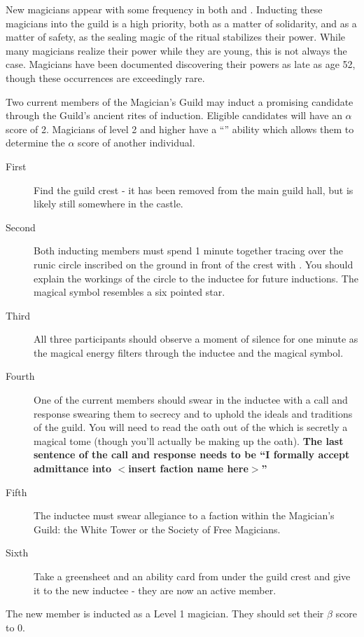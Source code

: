 \documentclass[green]{NeptuneBall}
\begin{document}
\name{\gInduction{}}

New magicians appear with some frequency in both \pPacifica{} and \pAtlantis{}. Inducting these magicians into the guild is a high priority, both as a matter of solidarity, and as a matter of safety, as the sealing magic of the ritual stabilizes their power. While many magicians realize their power while they are young, this is not always the case. Magicians have been documented discovering their powers as late as age 52, though these occurrences are exceedingly rare.

Two current members of the Magician's Guild may induct a promising candidate through the Guild's ancient rites of induction. Eligible candidates will have an $\alpha$ score of 2. Magicians of level 2 and higher have a ``\aPerceive{}'' ability which allows them to determine the $\alpha$ score of another individual.
\begin{description}
\item[First] Find the guild crest - it has been removed from the main guild hall, but is likely still somewhere in the castle. 
\item[Second] Both inducting members must spend 1 minute together tracing over the runic circle inscribed on the ground in front of the crest with \iChalk{}. You should explain the workings of the circle to the inductee for future inductions. The magical symbol resembles a six pointed star. 
\item[Third] All three participants should observe a moment of silence for one minute as the magical energy filters through the inductee and the magical symbol. 
\item[Fourth] One of the current members should swear in the inductee with a call and response swearing them to secrecy and to uphold the ideals and traditions of the guild. You will need to read the oath out of the \iBook{} which is secretly a magical tome (though you'll actually be making up the oath). {\bf The last sentence of the call and response needs to be ``I formally accept admittance into $<$insert faction name here$>$''}
\item[Fifth] The inductee must swear allegiance to a faction within the Magician's Guild: the White Tower or the Society of Free Magicians.
\item[Sixth] Take a greensheet and an ability card from under the guild crest and give it to the new inductee - they are now an active member.
\end{description}

The new member is inducted as a Level 1 magician. They should set their $\beta$ score to 0.
\end{document}
